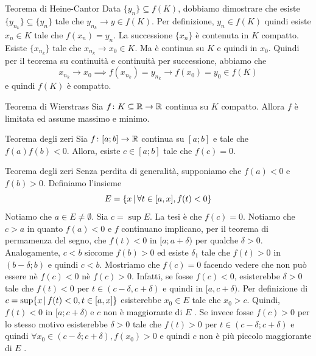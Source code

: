 \documentclass[a4paper]{article}
\begin{document}
\begin{snippetproof}{Teorema di Heine-Cantor}
    Data \(\{y_n\} \subseteq f(K)\), dobbiamo dimostrare che esiste \(\{y_{n_k}\} \subseteq \{y_n\}\)
    tale che \(y_{n_k} \to y \in f(K)\).
    Per definizione, \(y_n \in f(K)\) quindi esiste \(x_n \in K\) tale che \(f(x_n) = y_n\).
    La successione \(\{x_n\}\) è contenuta in \(K\) compatto.
    Esiste \(\{x_{n_k}\}\) tale che \(x_{n_k} \to x_0 \in K\).
    Ma è continua su \(K\) e quindi in \(x_0\).
    Quindi per il teorema su continuità e continuità per successione,
    abbiamo che
    \[
        x_{n_k} \to x_0 \implies f(x_{n_k}) = y_{n_k} \to f(x_0) = y_0 \in f(K)
    \]
    e quindi \(f(K)\) è compatto.
\end{snippetproof}

\begin{snippetcorollary}{Teorema di Wierstrass}
    Sia \(f\colon K \subseteq \mathbb{R} \to \mathbb{R}\)
    continua su \(K\) compatto. Allora \(f\) è limitata ed assume massimo e minimo.
\end{snippetcorollary}

\begin{snippettheorem}{Teorema degli zeri}
    Sia \(f\colon [a;b] \to \mathbb{R}\) continua su \([a;b]\)
    e tale che \(f(a)f(b) < 0\). Allora,
    esiste \(c \in [a;b]\) tale che \(f(c) = 0\).
\end{snippettheorem}

\begin{snippetproof}{Teorema degli zeri}
    Senza perdita di generalità, supponiamo che \(f(a) < 0\) e \(f(b) > 0\).
    Definiamo l'insieme
    \[
        E = \{x \,|\, \forall t \in [a,x], f(t) < 0\}
    \]
    Notiamo che \(a\in E \neq \emptyset\). Sia \(c = \sup E\).
    La tesi è che \(f(c) = 0\). Notiamo che \(c>a\) in quanto \(f(a) < 0\)
    e \(f\) continuano implicano, per il teorema di permamenza del segno, che \(f(t) < 0\)
    in \([a; a+\delta)\) per qualche \(\delta > 0\). Analogamente, \(c < b\)
    siccome \(f(b) > 0\) ed esiste \(\delta_1\) tale che \(f(t)>0\)
    in \((b-\delta;b)\) e quindi \(c<b\).
    Mostriamo che \(f(c) = 0\) facendo vedere che non può essere nè \(f(c) < 0\)
    nè \(f(c) > 0\).
    Infatti, se fosse \(f(c) < 0\), esisterebbe \(\delta>0\) tale che \(f(t) < 0\)
    per \(t\in (c-\delta, c+\delta)\) e quindi in \([a, c+\delta)\). Per definizione di
    \(c = \sup\{x \,|\, f(t) < 0, t \in [a,x]\}\) esisterebbe \(x_0 \in E\)
    tale che \(x_0>c\).
    Quindi, \(f(t) < 0\) in \([a; c+\delta)\) e \(c\) non è maggiorante di \(E\) \lightning.
    Se invece fosse \(f(c) > 0\) per lo stesso motivo esisterebbe \(\delta > 0\)
    tale che \(f(t) > 0\) per \(t\in (c-\delta; c+\delta)\) e quindi
    \(\forall x_0 \in (c-\delta; c+\delta), f(x_0) > 0\) e quindi
    \(c\) non è più piccolo maggiorante di \(E\) \lightning.
\end{snippetproof}
\end{document}
